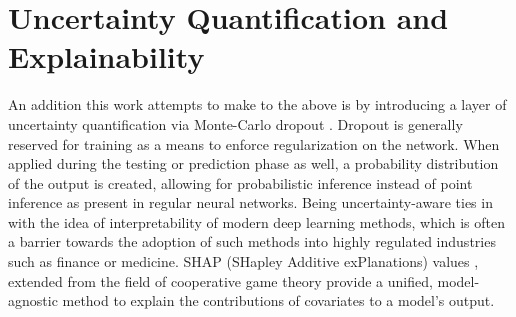 \documentclass[%
 reprint,
 amsmath,amssymb,
 aps,
]{revtex4-2}
\begin{document}
\section{\label{UQ_explain}Uncertainty Quantification and Explainability}
An addition this work attempts to make to the above is by introducing a layer of uncertainty quantification via Monte-Carlo dropout \cite{mcdropout}. Dropout is generally reserved for training as a means to enforce regularization on the network. When applied during the testing or prediction phase as well, a probability distribution of the output is created, allowing for probabilistic inference instead of point inference as present in regular neural networks. Being uncertainty-aware ties in with the idea of interpretability of modern deep learning methods, which is often a barrier towards the adoption of such methods into highly regulated industries such as finance or medicine. SHAP (SHapley Additive exPlanations) values \cite{shap}, extended from the field of cooperative game theory provide a unified, model-agnostic method to explain the contributions of covariates to a model's output.

\cite{*}

\end{document}

